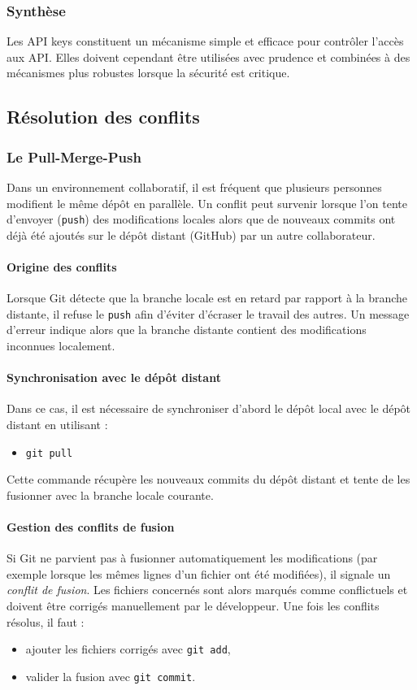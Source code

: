 \documentclass{article}
\begin{document}
\subsubsection{Synthèse}

Les API keys constituent un mécanisme simple et efficace pour contrôler l’accès aux API.  
Elles doivent cependant être utilisées avec prudence et combinées à des mécanismes plus robustes lorsque la sécurité est critique.




\subsection{Résolution des conflits}

\subsubsection{ Le Pull-Merge-Push}
Dans un environnement collaboratif, il est fréquent que plusieurs personnes modifient le même dépôt en parallèle. Un conflit peut survenir lorsque l’on tente d’envoyer (\texttt{push}) des modifications locales alors que de nouveaux commits ont déjà été ajoutés sur le dépôt distant (GitHub) par un autre collaborateur.

\paragraph{Origine des conflits}
Lorsque Git détecte que la branche locale est en retard par rapport à la branche distante, il refuse le \texttt{push} afin d’éviter d’écraser le travail des autres. Un message d’erreur indique alors que la branche distante contient des modifications inconnues localement.

\paragraph{Synchronisation avec le dépôt distant}
Dans ce cas, il est nécessaire de synchroniser d’abord le dépôt local avec le dépôt distant en utilisant :
\begin{itemize}
    \item \texttt{git pull}
\end{itemize}
Cette commande récupère les nouveaux commits du dépôt distant et tente de les fusionner avec la branche locale courante.

\paragraph{Gestion des conflits de fusion}
Si Git ne parvient pas à fusionner automatiquement les modifications (par exemple lorsque les mêmes lignes d’un fichier ont été modifiées), il signale un \emph{conflit de fusion}. Les fichiers concernés sont alors marqués comme conflictuels et doivent être corrigés manuellement par le développeur.  
Une fois les conflits résolus, il faut :
\begin{itemize}
    \item ajouter les fichiers corrigés avec \texttt{git add},
    \item valider la fusion avec \texttt{git commit}.
\end{itemize}
\end{document}
